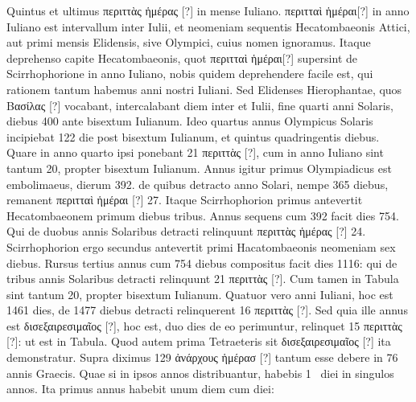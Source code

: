 Quintus et ultimus
\textgreek{περιττὰς ἡμέρας [?]} in mense Iuliano.
\textgreek{περιτταὶ ἡμέραι[?]} in anno Iuliano
est intervallum inter  Iulii,
 et neomeniam sequentis Hecatombaeonis
Attici, aut primi mensis Elidensis, sive Olympici, cuius nomen
ignoramus.
Itaque deprehenso capite Hecatombaeonis, quot
\textgreek{περιτταὶ ἡμέραι[?]} supersint de Scirrhophorione in anno Iuliano,
 nobis quidem
deprehendere facile est, qui rationem tantum habemus anni nostri
Iuliani.
Sed Elidenses Hierophantae, quos \textgreek{Βασίλας [?]} vocabant,
intercalabant
diem inter  et  Iulii, fine quarti anni Solaris, diebus
400 ante bisextum Iulianum.
Ideo quartus annus Olympicus Solaris
incipiebat 122 die post bisextum Iulianum, et quintus quadringentis
diebus.
Quare in anno quarto ipsi ponebant 21 \textgreek{περιττὰς [?]}, cum in
anno Iuliano sint tantum 20, propter bisextum Iulianum.
Annus igitur
primus Olympiadicus est embolimaeus, dierum 392. de quibus
detracto anno Solari, nempe 365 diebus, remanent
 \textgreek{περιτταὶ ἡμέραι [?]} 27.
Itaque Scirrhophorion primus antevertit Hecatombaeonem primum
diebus tribus.
Annus sequens cum 392 facit dies 754.
Qui de duobus
annis Solaribus detracti relinquunt \textgreek{περιττὰς ἡμέρας [?]} 24.
Scirrhophorion
ergo secundus antevertit primi Hacatombaeonis neomeniam sex diebus.
Rursus tertius annus cum 754 diebus compositus facit dies 1116: qui
de tribus annis Solaribus detracti relinquunt 21 \textgreek{περιττὰς [?]}.
Cum tamen in
Tabula sint tantum 20, propter bisextum Iulianum.
Quatuor vero anni
Iuliani, hoc est 1461 dies, de 1477 diebus detracti relinquerent 16
\textgreek{περιττὰς [?]}.
Sed quia ille annus est \textgreek{δισεξαιρεσιμαῖος [?]}, hoc est,
 duo dies de eo
perimuntur, relinquet 15 \textgreek{περιττὰς [?]}: ut est in Tabula.
Quod autem prima
Tetraeteris sit \textgreek{δισεξαιρεσιμαῖος [?]} ita demonstratur.
Supra diximus 129
\textgreek{ἀνάρχους ἡμέρασ [?]} tantum esse debere in 76 annis Graecis.
Quae si in ipsos
annos distribuantur, habebis 1~ diei in singulos annos.
Ita primus annus
habebit unum diem cum  diei:
